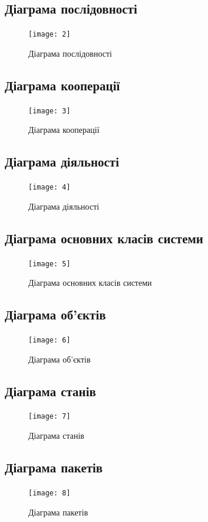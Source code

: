 \documentclass[oneside,14pt]{extarticle}
\begin{document}
\begin{normalsize}
	\subsection{Діаграма послідовності}
	\begin{figure}[H]
		\centering
		\texttt{[image: 2]}
		\caption{Діаграма послідовності}
	\end{figure}
	
	\subsection{Діаграма кооперації}
	\begin{figure}[H]
		\centering
		\texttt{[image: 3]}
		\caption{Діаграма кооперації}
	\end{figure}
	
	\subsection{Діаграма діяльності}
	\begin{figure}[H]
		\centering
		\texttt{[image: 4]}
		\caption{Діаграма діяльності}
	\end{figure}
	
	\subsection{Діаграма основних класів системи}
	\begin{figure}[H]
		\centering
		\texttt{[image: 5]}
		\caption{Діаграма основних класів системи}
	\end{figure}
	
	\subsection{Діаграма об’єктів}
	\begin{figure}[H]
		\centering
		\texttt{[image: 6]}
		\caption{Діаграма об’єктів}
	\end{figure}
	
	\subsection{Діаграма станів}
	\begin{figure}[H]
		\centering
		\texttt{[image: 7]}
		\caption{Діаграма станів}
	\end{figure}
	
	\subsection{Діаграма пакетів}
	\begin{figure}[H]
		\centering
		\texttt{[image: 8]}
		\caption{Діаграма пакетів}
	\end{figure}
	

\end{normalsize}
\end{document}
